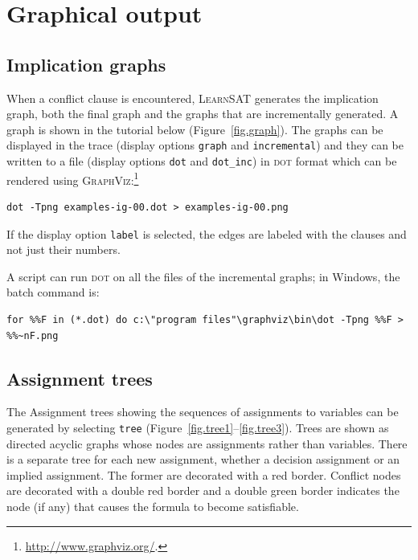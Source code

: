 \documentclass[11pt]{report}
\newcommand*{\p}[1]{\textup{\texttt{#1}}}
\newcommand*{\ls}{\textsc{LearnSAT}}
\newcommand*{\dt}{\textsc{dot}}
\begin{document}
\clearpage

\section{Graphical output}

\subsection{Implication graphs}\label{s.impl}

When a conflict clause is encountered, \ls{} generates the implication
graph, both the final graph and the graphs that are incrementally
generated. A graph is shown in the tutorial below
(Figure~\ref{fig.graph}). The graphs can be displayed in the trace
(display options \p{graph} and \p{incremental}) and they can be written
to a file (display options \p{dot} and \p{dot\_inc}) in \dt{} format
which can be rendered using
\textsc{GraphViz}:\footnote{\url{http://www.graphviz.org/}.}

\begin{verbatim}
dot -Tpng examples-ig-00.dot > examples-ig-00.png
\end{verbatim}

If the display option \p{label} is selected, the edges are labeled with
the clauses and not just their numbers.

A script can run \dt{} on all the files of the incremental graphs; in
Windows, the batch command is:

\begin{verbatim}
for %%F in (*.dot) do c:\"program files"\graphviz\bin\dot -Tpng %%F > %%~nF.png
\end{verbatim}


\subsection{Assignment trees}

The Assignment trees showing the sequences of assignments to variables
can be generated by selecting \p{tree}
(Figure~\ref{fig.tree1}--\ref{fig.tree3}). Trees are shown as directed
acyclic graphs whose nodes are assignments rather than variables. There
is a separate tree for each new assignment, whether a decision
assignment or an implied assignment. The former are decorated with a red
border. Conflict nodes are decorated with a double red border and a
double green border indicates the node (if any) that causes the formula
to become satisfiable.
\end{document}

